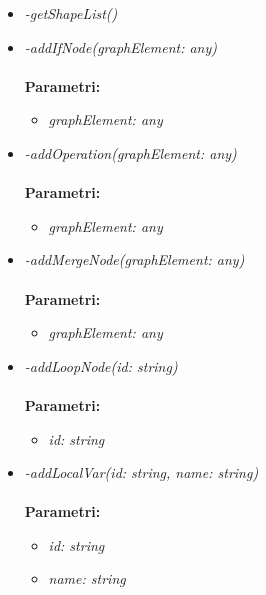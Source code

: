 \begin{itemize}
\begin{itemize}
    		\item \emph{-getShapeList()}\\
    		
    		
    		\item \emph{-addIfNode(graphElement: any)}\\
    		\\
    		\textbf{Parametri:}
    		\begin{itemize}
    			\item \emph{graphElement: any}\\
    			
    		\end{itemize}
    		\item \emph{-addOperation(graphElement: any)}\\
    		\\
    		\textbf{Parametri:}
    		\begin{itemize}
    			\item \emph{graphElement: any}\\
    			
    		\end{itemize}
    		\item \emph{-addMergeNode(graphElement: any)}\\
    		\\
    		\textbf{Parametri:}
    		\begin{itemize}
    			\item \emph{graphElement: any}\\
    			
    		\end{itemize}
    		\item \emph{-addLoopNode(id: string)}\\
    		\\
    		\textbf{Parametri:}
    		\begin{itemize}
    			\item \emph{id: string}\\
    			
    		\end{itemize}
    		\item \emph{-addLocalVar(id: string, name: string)}\\
    		\\
    		\textbf{Parametri:}
    		\begin{itemize}
    			\item \emph{id: string}\\
    			
    			\item \emph{name: string}\\
    			

\end{itemize}
\end{itemize}
\end{itemize}
